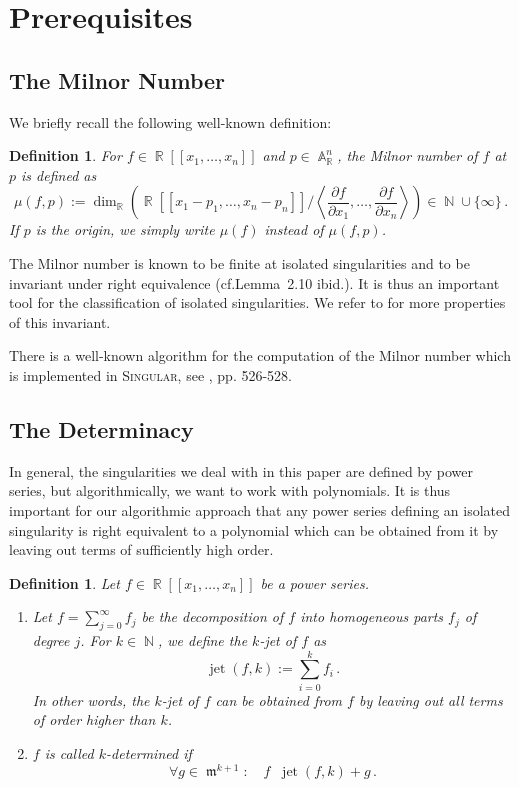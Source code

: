 \documentclass[noend]{amsproc}
\newtheorem{defn}[theorem]{Definition}
\theoremstyle{definition}
\newcommand{\Singular}{\textsc{Singular}}
\DeclareMathOperator{\requiv}{\overset{r}{\sim}}
\DeclareMathOperator{\m}{\mathfrak{m}}
\DeclareMathOperator{\jet}{jet}
\DeclareMathOperator{\N}{\mathbb{N}}
\DeclareMathOperator{\R}{\mathbb{R}}
\DeclareMathOperator{\A}{\mathbb{A}}
\begin{document}
\section{Prerequisites}%
\label{sec:prerequisites}

\subsection{The Milnor Number}%
\label{subsec:milnor_number}

We briefly recall the following well-known definition:

\begin{defn}
For $f \in \R[[x_1,\ldots,x_n]]$ and $p \in \A_{\R}^n$, the
\emph{Milnor number} of $f$ at $p$ is defined as
\[
\mu(f, p) := \dim_{\R}
\left( \R[[x_1-p_1, \ldots, x_n-p_n]] \bigg/
\left\langle \frac{\partial f}{\partial x_1}, \ldots,
\frac{\partial f}{\partial x_n} \right\rangle \right)
\in \N \cup \{\infty\} \,.
\]
If $p$ is the origin, we simply write $\mu(f)$ instead of $\mu(f, p)$.
\end{defn}

The Milnor number is known to be finite at isolated singularities
\citep[cf.\@][Lemma~2.3]{GLS2007} and to be invariant under right equivalence
(cf.\@ Lemma~2.10 ibid.). It is thus an important tool for the classification
of isolated singularities. We refer to \citet{GLS2007} for more properties of
this invariant.

There is a well-known algorithm for the computation of the Milnor number which
is implemented in \Singular{}, see \citet{GP2008}, pp. 526-528.


\subsection{The Determinacy}%
\label{subsec:determinacy}

In general, the singularities we deal with in this paper are defined by power
series, but algorithmically, we want to work with polynomials. It is thus
important for our algorithmic approach that any power series defining an
isolated singularity is right equivalent to a polynomial which can be obtained
from it by leaving out terms of sufficiently high order.

\begin{defn}
Let $f \in \R[[x_1,\ldots,x_n]]$ be a power series.

\begin{enumerate}
\item Let $f = \sum_{j=0}^\infty f_j$ be the decomposition of $f$ into
homogeneous parts $f_j$ of degree $j$.
For $k \in \N$, we define the \emph{$k$-jet} of $f$ as
\[
\jet(f,k) := \sum_{i=0}^k f_i \,.
\]
In other words, the $k$-jet of $f$ can be obtained from $f$ by leaving out all
terms of order higher than $k$.

\item $f$ is called \emph{$k$-determined} if
\[
\forall g \in \m^{k+1}: \quad f \requiv \jet(f,k)+g \,.
\]
\end{enumerate}
\end{defn}
\end{document}
